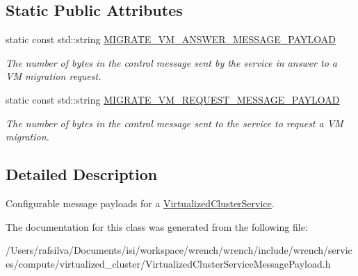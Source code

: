 \subsection*{Static Public Attributes}
\begin{DoxyCompactItemize}
\item 
\mbox{\label{classwrench_1_1_virtualized_cluster_service_message_payload_a629cdac5b7c9d6e88521c251fe6ac66e}} 
static const std\+::string \hyperlink{classwrench_1_1_virtualized_cluster_service_message_payload_a629cdac5b7c9d6e88521c251fe6ac66e}{M\+I\+G\+R\+A\+T\+E\+\_\+\+V\+M\+\_\+\+A\+N\+S\+W\+E\+R\+\_\+\+M\+E\+S\+S\+A\+G\+E\+\_\+\+P\+A\+Y\+L\+O\+AD}
\begin{DoxyCompactList}\small\item\em The number of bytes in the control message sent by the service in answer to a VM migration request. \end{DoxyCompactList}\item 
\mbox{\label{classwrench_1_1_virtualized_cluster_service_message_payload_ae19433e00c05d1f7c8c81373c361f930}} 
static const std\+::string \hyperlink{classwrench_1_1_virtualized_cluster_service_message_payload_ae19433e00c05d1f7c8c81373c361f930}{M\+I\+G\+R\+A\+T\+E\+\_\+\+V\+M\+\_\+\+R\+E\+Q\+U\+E\+S\+T\+\_\+\+M\+E\+S\+S\+A\+G\+E\+\_\+\+P\+A\+Y\+L\+O\+AD}
\begin{DoxyCompactList}\small\item\em The number of bytes in the control message sent to the service to request a VM migration. \end{DoxyCompactList}\end{DoxyCompactItemize}


\subsection{Detailed Description}
Configurable message payloads for a \hyperlink{classwrench_1_1_virtualized_cluster_service}{Virtualized\+Cluster\+Service}. 

The documentation for this class was generated from the following file\+:\begin{DoxyCompactItemize}
\item 
/\+Users/rafsilva/\+Documents/isi/workspace/wrench/wrench/include/wrench/services/compute/virtualized\+\_\+cluster/Virtualized\+Cluster\+Service\+Message\+Payload.\+h\end{DoxyCompactItemize}

